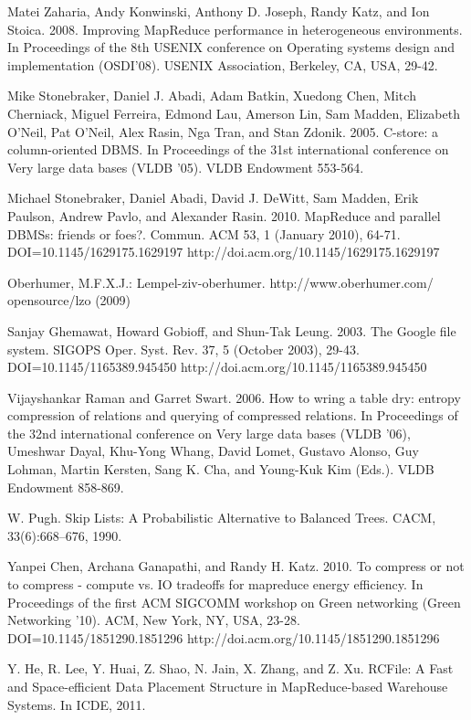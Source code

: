 \documentclass[twocolumn]{article}
\begin{document}
{\begin{thebibliography}{10}
 Matei Zaharia, Andy Konwinski, Anthony D. Joseph, Randy Katz,
                and Ion Stoica. 2008. Improving MapReduce performance
                in heterogeneous environments. In Proceedings of the
                8th USENIX conference on Operating systems design and
                implementation (OSDI'08). USENIX Association,
                Berkeley, CA, USA, 29-42.

 Mike Stonebraker, Daniel J. Abadi, Adam Batkin, Xuedong Chen,
                Mitch Cherniack, Miguel Ferreira, Edmond Lau, Amerson Lin,
                Sam Madden, Elizabeth O'Neil, Pat O'Neil, Alex Rasin,
                Nga Tran, and Stan Zdonik. 2005. C-store: a column-oriented
                DBMS. In Proceedings of the 31st international conference
                on Very large data bases (VLDB '05). VLDB Endowment 553-564.

 Michael Stonebraker, Daniel Abadi, David J. DeWitt, Sam Madden,
                Erik Paulson, Andrew Pavlo, and Alexander Rasin. 2010.
                MapReduce and parallel DBMSs: friends or foes?. Commun.
                ACM 53, 1 (January 2010), 64-71. DOI=10.1145/1629175.1629197
                http://doi.acm.org/10.1145/1629175.1629197

 Oberhumer, M.F.X.J.: Lempel-ziv-oberhumer. http://www.oberhumer.com/
		opensource/lzo (2009)

 Sanjay Ghemawat, Howard Gobioff, and Shun-Tak Leung. 2003.
                The Google file system. SIGOPS Oper. Syst. Rev. 37,
                5 (October 2003), 29-43. DOI=10.1145/1165389.945450
                http://doi.acm.org/10.1145/1165389.945450

 Vijayshankar Raman and Garret Swart. 2006. How to 
		wring a table dry: entropy compression of relations and querying of 
		compressed relations. In Proceedings of the 32nd international conference 
		on Very large data bases (VLDB '06), Umeshwar Dayal, Khu-Yong Whang, 
		David Lomet, Gustavo Alonso, Guy Lohman, Martin Kersten, Sang K. Cha, 
		and Young-Kuk Kim (Eds.). VLDB Endowment 858-869.

 W. Pugh. Skip Lists: A Probabilistic Alternative to
        	Balanced Trees. CACM, 33(6):668–676, 1990.

 Yanpei Chen, Archana Ganapathi, and Randy H. Katz. 2010. To compress
                or not to compress - compute vs. IO tradeoffs for mapreduce
                energy efficiency. In Proceedings of the first ACM SIGCOMM
                workshop on Green networking (Green Networking '10). ACM,
                New York, NY, USA, 23-28. DOI=10.1145/1851290.1851296
                http://doi.acm.org/10.1145/1851290.1851296

 Y. He, R. Lee, Y. Huai, Z. Shao, N. Jain, X. Zhang, and
        	Z. Xu. RCFile: A Fast and Space-efficient Data Placement
        	Structure in MapReduce-based Warehouse Systems. In ICDE, 2011.




\end{thebibliography}
}
\end{document}
